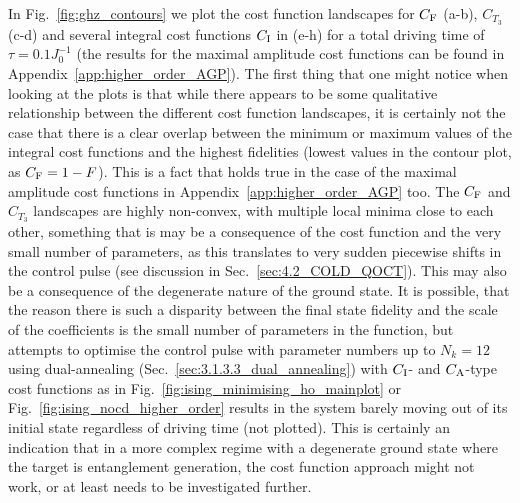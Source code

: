 In Fig.~\ref{fig:ghz_contours} we plot the cost function landscapes for $C_{\rm F}$ (a-b), $C_{T_3}$ (c-d) and several integral cost functions $C_{\rm I}$ in (e-h) for a total driving time of $\tau = 0.1J_0^{-1}$ (the results for the maximal amplitude cost functions can be found in Appendix~\ref{app:higher_order_AGP}). The first thing that one might notice when looking at the plots is that while there appears to be some qualitative relationship between the different cost function landscapes, it is certainly not the case that there is a clear overlap between the minimum or maximum values of the integral cost functions and the highest fidelities (lowest values in the contour plot, as $C_{\rm F} = 1 - F$). This is a fact that holds true in the case of the maximal amplitude cost functions in Appendix~\ref{app:higher_order_AGP} too. The $C_{\rm F}$ and $C_{T_3}$ landscapes are highly non-convex, with multiple local minima close to each other, something that is may be a consequence of the  cost function and the very small number of parameters, as this translates to very sudden piecewise shifts in the control pulse (see discussion in Sec.~\ref{sec:4.2_COLD_QOCT}). This may also be a consequence of the degenerate nature of the ground state. It is possible, that the reason there is such a disparity between the final state fidelity and the scale of the  coefficients is the small number of parameters in the  function, but attempts to optimise the  control pulse with parameter numbers up to $N_k = 12$ using dual-annealing (Sec.~\ref{sec:3.1.3.3_dual_annealing}) with $C_{\rm I}$- and $C_{\rm A}$-type cost functions as in Fig.~\ref{fig:ising_minimising_ho_mainplot} or Fig.~\ref{fig:ising_nocd_higher_order} results in the system barely moving out of its initial state regardless of driving time (not plotted). This is certainly an indication that in a more complex regime with a degenerate ground state where the target is entanglement generation, the  cost function approach might not work, or at least needs to be investigated further. 



